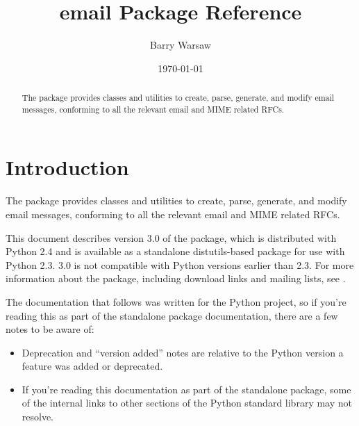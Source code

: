 \documentclass{howto}
\title{email Package Reference}
\author{Barry Warsaw}
\date{\today}
\begin{document}
\maketitle

\begin{abstract}
  The  package provides classes and utilities to create,
  parse, generate, and modify email messages, conforming to all the
  relevant email and MIME related RFCs.
\end{abstract}

%
\tableofcontents

\section{Introduction}
The  package provides classes and utilities to create,
parse, generate, and modify email messages, conforming to all the
relevant email and MIME related RFCs.

This document describes version 3.0 of the  package, which is
distributed with Python 2.4 and is available as a standalone distutils-based
package for use with Python 2.3.   3.0 is not compatible with
Python versions earlier than 2.3.  For more information about the
 package, including download links and mailing lists, see
.

The documentation that follows was written for the Python project, so
if you're reading this as part of the standalone 
package documentation, there are a few notes to be aware of:

\begin{itemize}
\item Deprecation and ``version added'' notes are relative to the
      Python version a feature was added or deprecated.

\item If you're reading this documentation as part of the
      standalone  package, some of the internal links to
      other sections of the Python standard library may not resolve.

\end{itemize}


\end{document}
